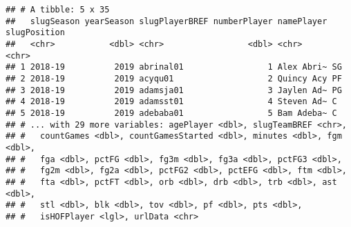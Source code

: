 \documentclass[]{article}
\newenvironment{Shaded}{\begin{snugshade}}{\end{snugshade}}
\newcommand{\KeywordTok}[1]{\textcolor[rgb]{0.13,0.29,0.53}{\textbf{#1}}}
\newcommand{\DataTypeTok}[1]{\textcolor[rgb]{0.13,0.29,0.53}{#1}}
\newcommand{\DecValTok}[1]{\textcolor[rgb]{0.00,0.00,0.81}{#1}}
\newcommand{\StringTok}[1]{\textcolor[rgb]{0.31,0.60,0.02}{#1}}
\newcommand{\OperatorTok}[1]{\textcolor[rgb]{0.81,0.36,0.00}{\textbf{#1}}}
\newcommand{\NormalTok}[1]{#1}
\begin{document}
\begin{Shaded}
\end{Shaded}

\begin{verbatim}
## # A tibble: 5 x 35
##   slugSeason yearSeason slugPlayerBREF numberPlayer namePlayer slugPosition
##   <chr>           <dbl> <chr>                 <dbl> <chr>      <chr>       
## 1 2018-19          2019 abrinal01                 1 Alex Abri~ SG          
## 2 2018-19          2019 acyqu01                   2 Quincy Acy PF          
## 3 2018-19          2019 adamsja01                 3 Jaylen Ad~ PG          
## 4 2018-19          2019 adamsst01                 4 Steven Ad~ C           
## 5 2018-19          2019 adebaba01                 5 Bam Adeba~ C           
## # ... with 29 more variables: agePlayer <dbl>, slugTeamBREF <chr>,
## #   countGames <dbl>, countGamesStarted <dbl>, minutes <dbl>, fgm <dbl>,
## #   fga <dbl>, pctFG <dbl>, fg3m <dbl>, fg3a <dbl>, pctFG3 <dbl>,
## #   fg2m <dbl>, fg2a <dbl>, pctFG2 <dbl>, pctEFG <dbl>, ftm <dbl>,
## #   fta <dbl>, pctFT <dbl>, orb <dbl>, drb <dbl>, trb <dbl>, ast <dbl>,
## #   stl <dbl>, blk <dbl>, tov <dbl>, pf <dbl>, pts <dbl>,
## #   isHOFPlayer <lgl>, urlData <chr>
\end{verbatim}
\end{document}
